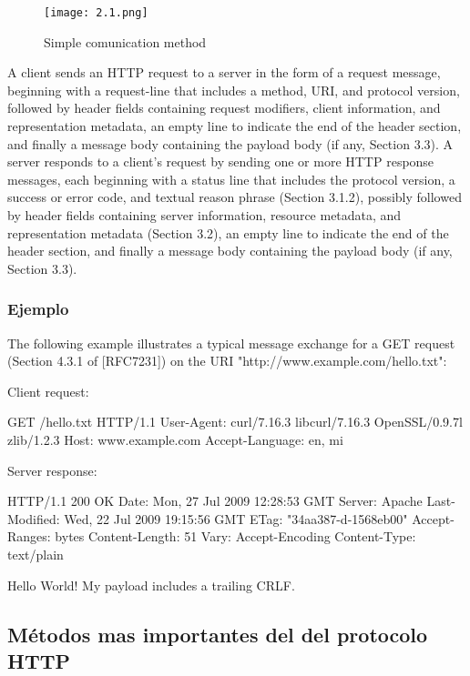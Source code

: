 \begin{center}
   \begin{figure}   
      \begin{center}
         \texttt{[image: 2.1.png]}
      \end{center}
      \caption{Simple comunication method}
   \end{figure}
\end{center}


A client sends an HTTP request to a server in the form of a request
message, beginning with a request-line that includes a method, URI,
and protocol version, followed by header fields
containing request modifiers, client information, and representation
metadata, an empty line to indicate the end of the
header section, and finally a message body containing the payload
body (if any, Section 3.3).
A server responds to a client's request by sending one or more HTTP
   response messages, each beginning with a status line that includes
   the protocol version, a success or error code, and textual reason
   phrase (Section 3.1.2), possibly followed by header fields containing
   server information, resource metadata, and representation metadata
   (Section 3.2), an empty line to indicate the end of the header
   section, and finally a message body containing the payload body (if
   any, Section 3.3).
\subsubsection*{Ejemplo}
The following example illustrates a typical message exchange for a
GET request (Section 4.3.1 of [RFC7231]) on the URI
"http://www.example.com/hello.txt":

Client request:

  GET /hello.txt HTTP/1.1
  User-Agent: curl/7.16.3 libcurl/7.16.3 OpenSSL/0.9.7l zlib/1.2.3
  Host: www.example.com
  Accept-Language: en, mi


Server response:

  HTTP/1.1 200 OK
  Date: Mon, 27 Jul 2009 12:28:53 GMT
  Server: Apache
  Last-Modified: Wed, 22 Jul 2009 19:15:56 GMT
  ETag: "34aa387-d-1568eb00"
  Accept-Ranges: bytes
  Content-Length: 51
  Vary: Accept-Encoding
  Content-Type: text/plain

  Hello World! My payload includes a trailing CRLF.

\subsection{Métodos mas importantes del del protocolo HTTP}

